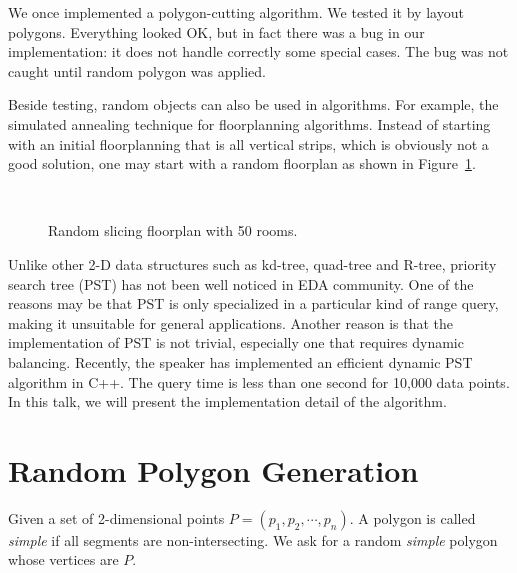 \documentclass{acm_proc_article-sp}          %
\begin{document}
We once implemented a polygon-cutting algorithm.
We tested it by layout polygons.
Everything looked OK, but in fact there was a bug in our
implementation: it does not handle correctly some special cases. 
The bug was not caught until random polygon was applied. 

Beside testing, random objects can also be used in algorithms. 
For example, the simulated annealing technique for floorplanning
algorithms. Instead of starting with an initial floorplanning that is
all vertical strips, which is obviously not a good solution, one may
start with a random floorplan as shown in Figure~\ref{fig:sf50}.

\begin{figure}[ht]
  \centering
  \\
  \caption{Random slicing floorplan with 50 rooms.}\label{fig:sf50}
\end{figure}

Unlike other 2-D data structures such as kd-tree, quad-tree and
R-tree, priority search tree (PST) has not been well noticed in EDA
community. One of the reasons may be that PST is only specialized in a
particular kind of range query, making it unsuitable for general
applications. Another reason is that the implementation of PST is not
trivial, especially one that requires dynamic balancing. Recently, the
speaker has implemented an efficient dynamic PST algorithm in C++. The
query time is less than one second for 10,000 data points. In this
talk, we will present the implementation detail of the algorithm. 

\section{Random Polygon Generation}
\label{sec:rpolygon}
Given a set of 2-dimensional points $P = (p_1, p_2, \cdots, p_n)$. 
A polygon is called \emph{simple} if all segments are
non-intersecting. 
We ask for a random \emph{simple} polygon whose vertices are $P$.
\end{document}
